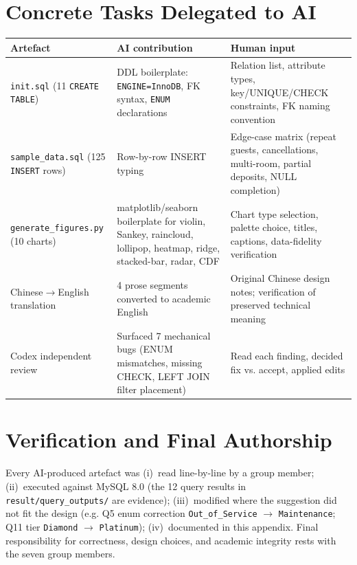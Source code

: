 \documentclass[11pt,a4paper]{article}
\begin{document}
\section{Concrete Tasks Delegated to AI}

\begin{tabularx}{\linewidth}{@{}p{3.6cm}X X@{}}
\toprule
\textbf{Artefact} & \textbf{AI contribution} & \textbf{Human input} \\
\midrule
\texttt{init.sql} (11 \texttt{CREATE TABLE}) & DDL boilerplate: \texttt{ENGINE=InnoDB}, FK syntax, \texttt{ENUM} declarations & Relation list, attribute types, key/UNIQUE/CHECK constraints, FK naming convention \\
\texttt{sample\_data.sql} (125 \texttt{INSERT} rows) & Row-by-row INSERT typing & Edge-case matrix (repeat guests, cancellations, multi-room, partial deposits, NULL completion) \\
\texttt{generate\_figures.py} (10 charts) & matplotlib/seaborn boilerplate for violin, Sankey, raincloud, lollipop, heatmap, ridge, stacked-bar, radar, CDF & Chart type selection, palette choice, titles, captions, data-fidelity verification \\
Chinese$\to$English translation & 4 prose segments converted to academic English & Original Chinese design notes; verification of preserved technical meaning \\
Codex independent review & Surfaced 7 mechanical bugs (ENUM mismatches, missing CHECK, LEFT JOIN filter placement) & Read each finding, decided fix vs. accept, applied edits \\
\bottomrule
\end{tabularx}

\section{Verification and Final Authorship}

Every AI-produced artefact was (i)~read line-by-line by a group member;
(ii)~executed against MySQL 8.0 (the 12 query results in
\texttt{result/query\_outputs/} are evidence); (iii)~modified where the
suggestion did not fit the design (e.g. Q5 enum correction
\texttt{Out\_of\_Service} $\to$ \texttt{Maintenance}; Q11 tier
\texttt{Diamond} $\to$ \texttt{Platinum}); (iv)~documented in this appendix.
Final responsibility for correctness, design choices, and academic
integrity rests with the seven group members.

\end{document}
